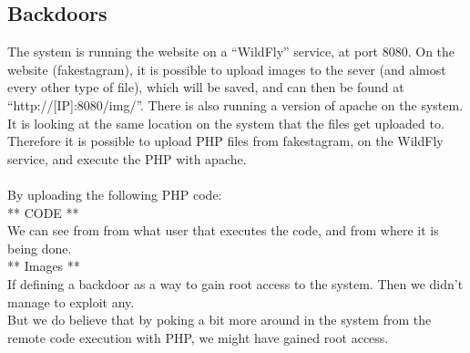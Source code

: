 \subsection{Backdoors}


The system is running the website on a “WildFly” service, at port 8080. On the website (fakestagram), it is possible to upload images to the sever (and almost every other type of file), which will be saved, and can then be found at “http://[IP]:8080/img/”. There is also running a version of apache on the system. It is looking at the same location on the system that the files get uploaded to. \\
Therefore it is possible to upload PHP files from fakestagram, on the WildFly service, and execute the PHP with apache. \\ \\
By uploading the following PHP code:\\
** CODE ** \\
We can see from from what user that executes the code, and from where it is being done. \\
** Images **\\
If defining a backdoor as a way to gain root access to the system. Then we didn't manage to exploit any. \\
But we do believe that by poking a bit more around in the system from the remote code execution with PHP, we might have gained root access.